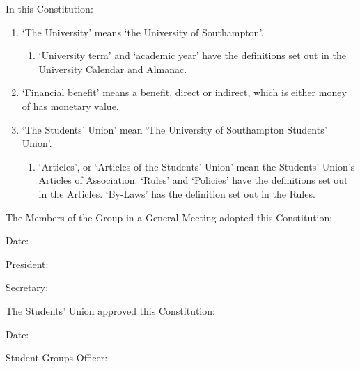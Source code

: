\documentclass[12pt]{constitution}
\begin{document}
In this Constitution:
\begin{enumerate}
    \item `The University' means `the University of Southampton'.
    \begin{enumerate}
        \item `University term' and `academic year' have the definitions set out in the University Calendar and Almanac.
    \end{enumerate}

    \item `Financial benefit' means a benefit, direct or indirect, which is either money of has monetary value.
    \item `The Students' Union' mean `The University of Southampton Students' Union'.
    \begin{enumerate}
        \item `Articles', or `Articles of the Students' Union' mean the Students' Union's Articles of Association. `Rules' and `Policies' have the definitions set out in the Articles. `By-Laws' has the definition set out in the Rules.
    \end{enumerate}
\end{enumerate}



The Members of the Group in a General Meeting adopted this Constitution:

Date: 

President: 

Secretary:

The Students' Union approved this Constitution:

Date:

Student Groups Officer:
\end{document}
